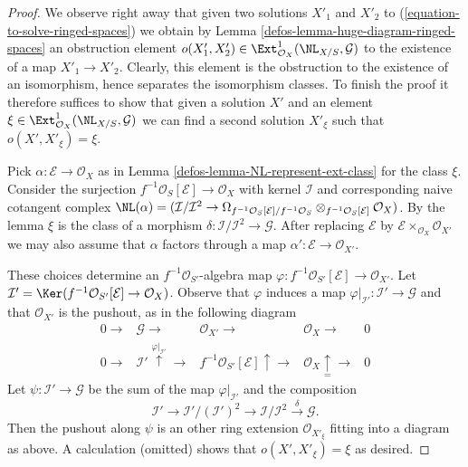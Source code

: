 \begin{proof}

We observe right away that given two solutions $X'_1$ and $X'_2$
to (\ref{equation-to-solve-ringed-spaces}) we obtain by
Lemma \ref{defos-lemma-huge-diagram-ringed-spaces} an obstruction element
$o(X'_1, X'_2) \in \Ext^1_{\mathcal{O}_X}(\NL_{X/S}, \mathcal{G})$
to the existence of a map $X'_1 \to X'_2$. Clearly, this element
is the obstruction to the existence of an isomorphism, hence separates
the isomorphism classes. To finish the proof it therefore suffices to
show that given a solution $X'$ and an element
$\xi \in \Ext^1_{\mathcal{O}_X}(\NL_{X/S}, \mathcal{G})$
we can find a second solution $X'_\xi$ such that
$o(X', X'_\xi) = \xi$.

\medskip\noindent
Pick $\alpha : \mathcal{E} \to \mathcal{O}_X$ as in
Lemma \ref{defos-lemma-NL-represent-ext-class}
for the class $\xi$. Consider the surjection
$f^{-1}\mathcal{O}_S[\mathcal{E}] \to \mathcal{O}_X$
with kernel $\mathcal{I}$ and corresponding naive cotangent complex
$\NL(\alpha) = (\mathcal{I}/\mathcal{I}^2 \to
\Omega_{f^{-1}\mathcal{O}_S[\mathcal{E}]/f^{-1}\mathcal{O}_S}
\otimes_{f^{-1}\mathcal{O}_S[\mathcal{E}]} \mathcal{O}_X)$.
By the lemma $\xi$ is the class of a morphism
$\delta : \mathcal{I}/\mathcal{I}^2 \to \mathcal{G}$.
After replacing $\mathcal{E}$ by
$\mathcal{E} \times_{\mathcal{O}_X} \mathcal{O}_{X'}$ we may also assume
that $\alpha$ factors through a map
$\alpha' : \mathcal{E} \to \mathcal{O}_{X'}$.

\medskip\noindent
These choices determine an $f^{-1}\mathcal{O}_{S'}$-algebra map
$\varphi : f^{-1}\mathcal{O}_{S'}[\mathcal{E}] \to \mathcal{O}_{X'}$. Let
$\mathcal{I}' = \Ker(f^{-1}\mathcal{O}_{S'}[\mathcal{E}] \to \mathcal{O}_X)$.
Observe that $\varphi$ induces a map
$\varphi|_{\mathcal{I}'} : \mathcal{I}' \to \mathcal{G}$
and that $\mathcal{O}_{X'}$ is the pushout, as in the following
diagram
$$
\begin{array}{ccccc}0 \longrightarrow & \mathcal{G} \longrightarrow & \mathcal{O}_{X'} \longrightarrow & \mathcal{O}_X \longrightarrow & 0 \\ 0 \longrightarrow & \mathcal{I}' \overset{\varphi|_{\mathcal{I}'}}{\uparrow}\longrightarrow & f^{-1}\mathcal{O}_{S'}[\mathcal{E}] \uparrow\longrightarrow & \mathcal{O}_X \underset{=}{\uparrow}\longrightarrow & 0\end{array}
$$
Let $\psi : \mathcal{I}' \to \mathcal{G}$ be the sum of the map
$\varphi|_{\mathcal{I}'}$ and the composition
$$
\mathcal{I}' \to \mathcal{I}'/(\mathcal{I}')^2 \to
\mathcal{I}/\mathcal{I}^2 \xrightarrow{\delta} \mathcal{G}.
$$
Then the pushout along $\psi$ is an other ring extension
$\mathcal{O}_{X'_\xi}$ fitting into a diagram as above.
A calculation (omitted) shows that $o(X', X'_\xi) = \xi$ as desired.
\end{proof}

